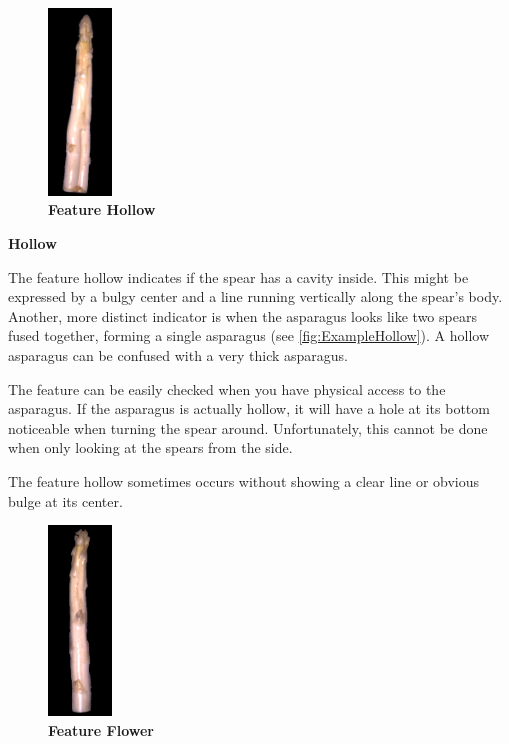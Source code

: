\begin{figure}
  \begin{center}
    \includegraphics[width=0.15\textwidth]{Figures/chapter03/example_img_hollow.png}
  \end{center}
  \vspace{-15pt}
  \caption[Example Image Feature Hollow]{ \textbf{Feature Hollow}}
  \vspace{10pt}
  \label{fig:ExampleHollow}
\end{figure}

\textbf{Hollow}

The feature hollow indicates if the spear has a cavity inside.
This might be expressed by a bulgy center and a line running vertically along the spear’s body. Another, more distinct indicator is when the asparagus looks like two spears fused together, forming a single asparagus (see \autoref{fig:ExampleHollow}). A hollow asparagus can be confused with a very thick asparagus.

The feature can be easily checked when you have physical access to the asparagus. If the asparagus is actually hollow, it will have a hole at its bottom noticeable when turning the spear around. Unfortunately, this cannot be done when only looking at the spears from the side.

The feature hollow sometimes occurs without showing a clear line or obvious bulge at its center.

\begin{figure}
  \begin{center}
    \includegraphics[width=0.15\textwidth]{Figures/chapter03/example_img_flower.png}
  \end{center}
  \vspace{-15pt}
  \caption[Example Image Feature Flower]{ \textbf{Feature Flower}}
  \vspace{-10pt}
  \label{fig:ExampleFlower}
\end{figure}

